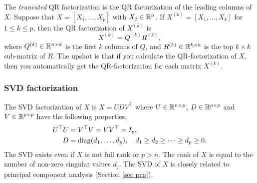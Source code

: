 The \emph{truncated} QR factorization is the QR factorization of the leading columns of $X$. Suppose that $X=[X_1,\ldots,X_p]$ with $X_j \in \mathbb{R}^n$. If $X^{(k)}=[X_1,\ldots,X_k]$ for $1 \le k \le p$, then the QR factorization of $X^{(k)}$ is
\[X^{(k)} = Q^{(k)}R^{(k)}, \]
where $Q^{(k)} \in \mathbb{R}^{n \times k}$ is the first $k$ columns of $Q$, and $R^{(k)} \in \mathbb{R}^{k \times k}$ is the top $k \times k$ sub-matrix of $R$. The upshot is that if you calculate the QR-factorization of $X$, then you automatically get the QR-factorization for each matrix $X^{(k)}$.





\subsubsection*{SVD factorization}

The SVD factorization of $X$ is $X=UDV^\top$ where $U \in \mathbb{R}^{n \times p}$, $D \in \mathbb{R}^{p \times p}$ and $V \in \mathbb{R}^{p \times p}$ have the following properties,
\begin{align*}
    U^\top U &= V^\top V = VV^\top = I_p,\\
    D &= \operatorname{diag}(d_1,\ldots,d_p), \quad d_1 \ge d_2 \ge \cdots \ge d_p \ge 0.
\end{align*}
The SVD exists even if $X$ is not full rank or $p > n$. The rank of $X$ is equal to the number of non-zero singular values $d_j$. The SVD of $X$ is closely related to principal  component analysis (Section \ref{sec pca}). 

